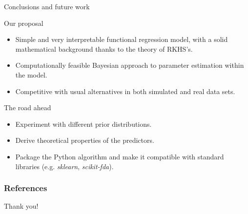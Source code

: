 \documentclass[10pt, english, professionalfonts]{beamer}
\begin{document}
\begin{frame}{Conclusions and future work}

  \begin{alertblock}{Our proposal}
    \begin{itemize}
      \item Simple and very interpretable functional regression model, with a solid mathematical background thanks to the theory of RKHS's.
      \item Computationally feasible Bayesian approach to parameter estimation within the model.
      \item Competitive with usual alternatives in both simulated and real data sets.
    \end{itemize}
  \end{alertblock}

  \begin{exampleblock}{The road ahead}
    \begin{itemize}
      \item Experiment with different prior distributions.
      \item Derive theoretical properties of the predictors.
      \item Package the Python algorithm and make it compatible with standard libraries (e.g. \textit{sklearn}, \textit{scikit-fda}).
    \end{itemize}
  \end{exampleblock}


\end{frame}

\begin{frame}[allowframebreaks]
    \frametitle{References}
    \nocite{*}
    \printbibliography[heading=none]
\end{frame}

\begin{frame}[standout]
  Thank you!
\end{frame}
\end{document}
